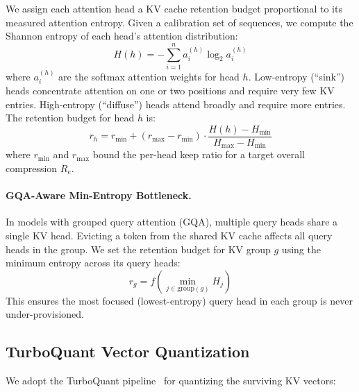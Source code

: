 \documentclass[11pt]{article}
\begin{document}
We assign each attention head a KV cache retention budget proportional to its measured attention entropy.  Given a calibration set of sequences, we compute the Shannon entropy of each head's attention distribution:
\begin{equation}
    H(h) = -\sum_{i=1}^{n} a_i^{(h)} \log_2 a_i^{(h)}
    \label{eq:entropy}
\end{equation}
where $a_i^{(h)}$ are the softmax attention weights for head $h$.  Low-entropy (``sink'') heads concentrate attention on one or two positions and require very few KV entries.  High-entropy (``diffuse'') heads attend broadly and require more entries.  The retention budget for head $h$ is:
\begin{equation}
    r_h = r_{\min} + (r_{\max} - r_{\min}) \cdot \frac{H(h) - H_{\min}}{H_{\max} - H_{\min}}
    \label{eq:budget}
\end{equation}
where $r_{\min}$ and $r_{\max}$ bound the per-head keep ratio for a target overall compression $R_e$.

\paragraph{GQA-Aware Min-Entropy Bottleneck.}
In models with grouped query attention (GQA), multiple query heads share a single KV head.  Evicting a token from the shared KV cache affects all query heads in the group.  We set the retention budget for KV group $g$ using the minimum entropy across its query heads:
\begin{equation}
    r_g = f\!\left(\min_{j \in \mathrm{group}(g)} H_j\right)
    \label{eq:gqa_bottleneck}
\end{equation}
This ensures the most focused (lowest-entropy) query head in each group is never under-provisioned.

\subsection{TurboQuant Vector Quantization}
\label{sec:turboquant}

We adopt the TurboQuant pipeline~\citep{duanmu2024turboquant} for quantizing the surviving KV vectors:
\end{document}
